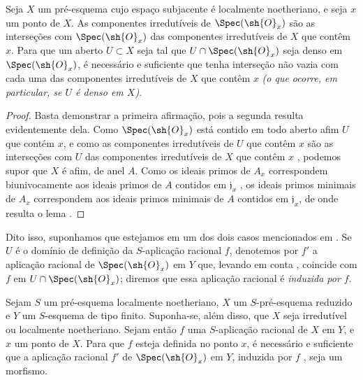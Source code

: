 \documentclass[oneside]{amsart}
\newcommand{\oldpage}[2][]{{\marginnote{\normalfont\textbf{#1}~|~#2}}\ignorespaces}
\let\EGAOriginalLabel\label
\renewcommand{\label}[1]{\phantomsection\EGAOriginalLabel{#1}}
\begin{document}
\begin{lemma}[7.2.8.1]
\label{I.7.2.8.1}
Seja $X$ um pré-esquema cujo espaço subjacente é localmente noetheriano, e seja $x$ um ponto de $X$.
As componentes irredutíveis de $\Spec(\sh{O}_x)$ são as interseções com $\Spec(\sh{O}_x)$ das componentes irredutíveis de $X$ que contêm $x$.
Para que um aberto $U\subset X$ seja tal que $U\cap\Spec(\sh{O}_x)$ seja denso em $\Spec(\sh{O}_x)$, é necessário e suficiente que tenha interseção não vazia com cada uma das componentes irredutíveis de $X$ que contêm $x$ \emph{(o que ocorre, em particular, se $U$ é \emph{denso} em $X$)}.
\end{lemma}

\begin{proof}
Basta demonstrar a primeira afirmação, pois a segunda resulta evidentemente dela.
Como $\Spec(\sh{O}_x)$ está contido em todo aberto afim $U$ que contém $x$, e como as componentes irredutíveis de $U$ que contêm $x$ são as interseções com $U$ das componentes irredutíveis de $X$ que contêm $x$ , podemos supor que $X$ é afim, de anel $A$.
Como os ideais primos de $A_x$ correspondem biunivocamente aos ideais primos
\oldpage[I]{161}
de $A$ contidos em $\mathfrak{j}_x$ , os ideais primos minimais de $A_x$ correspondem aos ideais primos minimais de $A$ contidos em $\mathfrak{j}_x$, de onde resulta o lema .
\end{proof}

Dito isso, suponhamos que estejamos em um dos dois casos mencionados em .
Se $U$ é o domínio de definição da $S$-aplicação racional $f$, denotemos por $f'$ a aplicação racional de $\Spec(\sh{O}_x)$ em $Y$ que, levando em conta , coincide com $f$ em $U\cap\Spec(\sh{O}_x)$; diremos que essa aplicação racional é \emph{induzida por $f$}.

\begin{proposition}[7.2.9]
\label{I.7.2.9}
Sejam $S$ um pré-esquema localmente noetheriano, $X$ um $S$-pré-esquema reduzido e $Y$ um $S$-esquema de tipo finito.
Suponha-se, além disso, que $X$ seja irredutível ou localmente noetheriano.
Sejam então $f$ uma $S$-aplicação racional de $X$ em $Y$, e $x$ um ponto de $X$.
Para que $f$ esteja definida no ponto $x$, é necessário e suficiente que a aplicação racional $f'$ de $\Spec(\sh{O}_x)$ em $Y$, induzida por $f$ , seja um morfismo.
\end{proposition}
\end{document}
